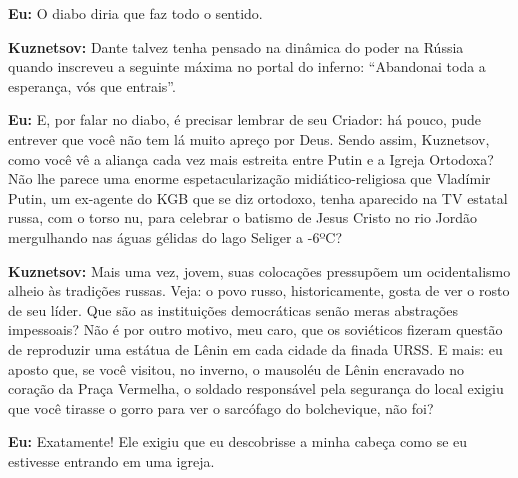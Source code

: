 \textbf{Eu:} O diabo diria que faz todo o sentido.

\textbf{Kuznetsov:} Dante talvez tenha pensado na dinâmica do poder na
Rússia quando inscreveu a seguinte máxima no portal do inferno:
``Abandonai toda a esperança, vós que entrais''.

\textbf{Eu:} E, por falar no diabo, é precisar lembrar de seu Criador:
há pouco, pude entrever que você não tem lá muito apreço por Deus. Sendo
assim, Kuznetsov, como você vê a aliança cada vez mais estreita entre
Putin e a Igreja Ortodoxa? Não lhe parece uma enorme espetacularização
midiático-religiosa que Vladímir Putin, um ex-agente do KGB que se diz
ortodoxo, tenha aparecido na TV estatal russa, com o torso nu, para
celebrar o batismo de Jesus Cristo no rio Jordão mergulhando nas águas
gélidas do lago Seliger a -6ºC?

\textbf{Kuznetsov:} Mais uma vez, jovem, suas colocações pressupõem um
ocidentalismo alheio às tradições russas. Veja: o povo russo,
historicamente, gosta de ver o rosto de seu líder. Que são as
instituições democráticas senão meras abstrações impessoais? Não é por
outro motivo, meu caro, que os soviéticos fizeram questão de reproduzir
uma estátua de Lênin em cada cidade da finada URSS. E mais: eu aposto
que, se você visitou, no inverno, o mausoléu de Lênin encravado no
coração da Praça Vermelha, o soldado responsável pela segurança do local
exigiu que você tirasse o gorro para ver o sarcófago do bolchevique, não
foi?

\textbf{Eu:} Exatamente! Ele exigiu que eu descobrisse a minha cabeça
como se eu estivesse entrando em uma igreja.

